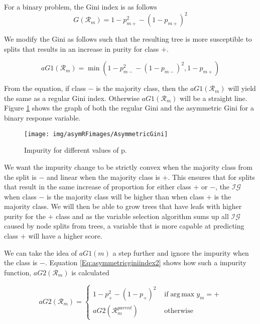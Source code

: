 \documentclass[twoside,11pt]{article}
\begin{document}
For a binary problem, the Gini index is as follows
\begin{equation}\label{eqn:giniindex}
	G(\mathcal{R}_m)=1-p_{m+}^2-(1-p_{m+})^2
\end{equation}

We modify the Gini as follows such that the resulting tree is more susceptible to splits that results in an increase in purity for class $+$. 

\begin{equation}\label{eqn:asymmetricginiindex1}
	aG1(\mathcal{R}_m)=\min(1-p_{m-}^2-(1-p_{m-})^2, 1-p_{m+})
\end{equation}

From the equation, if class $-$ is the majority class, then the $aG1(\mathcal{R}_m)$ will yield the same as a regular Gini index. Otherwise  $aG1(\mathcal{R}_m)$ will be a straight line. Figure \ref{Fig:Quantile Regression} shows the graph of both the regular Gini and the asymmetric Gini for a binary response variable.
\begin{figure}
 \centering
\texttt{[image: img/asymRFimages/AsymmetricGini]}\\
 \caption{Impurity for different values of p.}
 \label{Fig:Quantile Regression}
\end{figure}
We want the impurity change to be strictly convex when the majority class from the split is $-$ and linear when the majority class is $+$. This ensures that for splits that result in the same increase of proportion for either class $+$ or $-$, the $\mathcal{IG}$ when class $-$ is the majority class will be higher than when class $+$ is the majority class. We will then be able to grow trees that have leafs with higher purity for the $+$ class and as the variable selection algorithm sums up all $\mathcal{IG}$ caused by node splits from trees, a variable that is more capable at predicting class $+$ will have a higher score. 

We can take the idea of $aG1(m)$ a step further and ignore the impurity when the class is $-$. Equation \ref{Eq:asymmetricginiindex2} shows how such a impurity function, $aG2(\mathcal{R}_m)$ is calculated

\begin{equation}\label{Eq:asymmetricginiindex2}
aG2(\mathcal{R}_m)=
\begin{cases} 1-p_{+}^2-(1-p_{+})^2 & \text{ if} \operatorname{arg\,max} y_m = + 
\\ aG2(\mathcal{R}_m^{parent})&\text{ otherwise}
\end{cases}
\end{equation}
\end{document}
